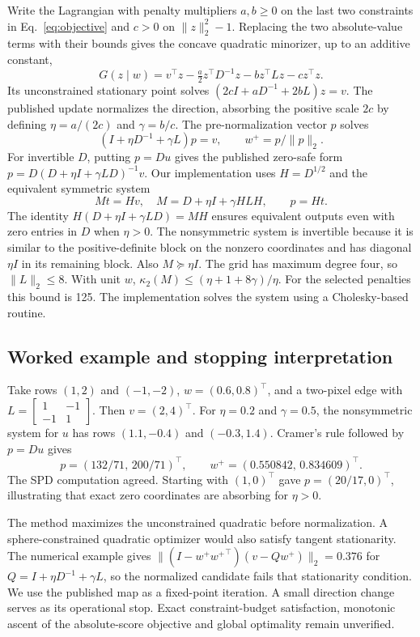 Write the Lagrangian with penalty multipliers $a,b\ge0$ on the last two constraints in Eq.~\eqref{eq:objective} and $c>0$ on $\|z\|_2^2-1$. Replacing the two absolute-value terms with their bounds gives the concave quadratic minorizer, up to an additive constant,
\[
 G(z\mid w) = v^\top z -\tfrac a2 z^\top D^{-1}z -b z^\top Lz-c z^\top z.
\]
Its unconstrained stationary point solves $(2cI+aD^{-1}+2bL)z=v$. The published update normalizes the direction, absorbing the positive scale $2c$ by defining $\eta=a/(2c)$ and $\gamma=b/c$. The pre-normalization vector $p$ solves
\begin{equation}
 (I+\eta D^{-1}+\gamma L)p=v,\qquad
 w^+=p/\|p\|_2 .
 \label{eq:original}
\end{equation}
For invertible $D$, putting $p=Du$ gives the published zero-safe form $p=D(D+\eta I+\gamma LD)^{-1}v$. Our implementation uses $H=D^{1/2}$ and the equivalent symmetric system
\begin{equation}
 M t=Hv,\quad M=D+\eta I+\gamma H L H,\qquad
 p=Ht .
 \label{eq:spd}
\end{equation}
The identity $H(D+\eta I+\gamma LD)=MH$ ensures equivalent outputs even with zero entries in $D$ when $\eta>0$. The nonsymmetric system is invertible because it is similar to the positive-definite block on the nonzero coordinates and has diagonal $\eta I$ in its remaining block. Also $M\succeq\eta I$. The grid has maximum degree four, so $\|L\|_2\le8$. With unit $w$, \(\kappa_2(M)\le(\eta+1+8\gamma)/\eta\). For the selected penalties this bound is 125. The implementation solves the system using a Cholesky-based routine.

\subsection{Worked example and stopping interpretation}

Take rows $(1,2)$ and $(-1,-2)$, $w=(0.6,0.8)^\top$, and a two-pixel edge with $L=\left[\begin{smallmatrix}1&-1\\-1&1\end{smallmatrix}\right]$. Then $v=(2,4)^\top$. For $\eta=0.2$ and $\gamma=0.5$, the nonsymmetric system for $u$ has rows $(1.1,-0.4)$ and $(-0.3,1.4)$. Cramer's rule followed by $p=Du$ gives
\[
 p=(132/71,\,200/71)^\top,\qquad w^+=(0.550842,\,0.834609)^\top.
\]
The SPD computation agreed. Starting with $(1,0)^\top$ gave $p=(20/17,0)^\top$, illustrating that exact zero coordinates are absorbing for $\eta>0$.

The method maximizes the unconstrained quadratic before normalization. A sphere-constrained quadratic optimizer would also satisfy tangent stationarity. The numerical example gives $\|(I-w^+{w^+}^\top)(v-Qw^+)\|_2=0.376$ for $Q=I+\eta D^{-1}+\gamma L$, so the normalized candidate fails that stationarity condition. We use the published map as a fixed-point iteration. A small direction change serves as its operational stop. Exact constraint-budget satisfaction, monotonic ascent of the absolute-score objective and global optimality remain unverified.
